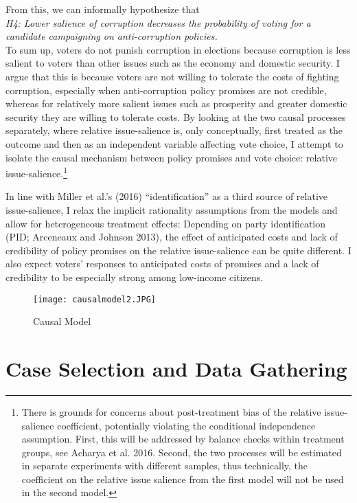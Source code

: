 \documentclass[11pt]{article}
\begin{document}
From this, we can informally hypothesize that \\
\textit{H4: Lower salience of corruption decreases the probability of voting for a candidate campaigning on anti-corruption policies.} \\
To sum up, voters do not punish corruption in elections because corruption is less salient to voters than other issues such as the economy and domestic security. I argue that this is because voters are not willing to tolerate the costs of fighting corruption, especially when anti-corruption policy promises are not credible, whereas for relatively more salient issues such as prosperity and greater domestic security they are willing to tolerate costs. By looking at the two causal processes separately, where relative issue-salience is, only conceptually, first treated as the outcome and then as an independent variable affecting vote choice, I attempt to isolate the causal mechanism between policy promises and vote choice: relative issue-salience.\footnote{There is grounds for concerns about post-treatment bias of the relative issue-salience coefficient, potentially violating the conditional independence assumption. First, this will be addressed by balance checks within treatment groups, see Acharya et al. 2016. Second, the two processes will be estimated in separate experiments with different samples, thus technically, the coefficient on the relative issue salience from the first model will not be used in the second model.}

In line with Miller et al.'s (2016) ``identification'' as a third source of relative issue-salience, I relax the implicit rationality assumptions from the models and allow for heterogeneous treatment effects: Depending on party identification (PID; Arceneaux and Johnson 2013), the effect of anticipated costs and lack of credibility of policy promises on the relative issue-salience can be quite different. I also expect voters' responses to anticipated costs of promises and a lack of credibility to be especially strong among low-income citizens.

\begin{figure}[!ht]
\begin{center}
\texttt{[image: causalmodel2.JPG]}
\caption{Causal Model}
\label{fig:fig1}
\end{center}
\end{figure}

\newpage
\section{Case Selection and Data Gathering}
\end{document}

